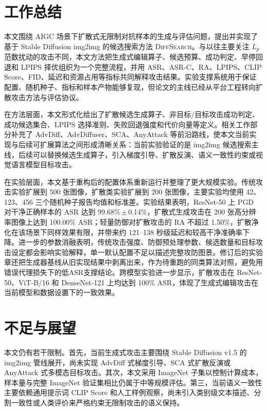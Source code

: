 \documentclass[type=bachelor,oneside]{fduthesis}
\newcommand{\methodname}{\textsc{DiffSearch}}
\begin{document}
\section{工作总结}

本文围绕 AIGC 场景下扩散式无限制对抗样本的生成与评估问题，提出并实现了基于 Stable Diffusion img2img 的候选搜索方法 \methodname。与以往主要关注 $L_p$ 范数扰动的攻击不同，本文方法把生成式编辑算子、候选预算、成功判定、早停回退和 LPIPS 择优组织为一个完整流程，并用 ASR、ASR-C、RA、LPIPS、CLIP Score、FID、延迟和资源占用等指标共同解释攻击结果。实验支撑系统用于保证配置、随机种子、指标和样本产物能够复现，但论文的主线已经从平台工程转向扩散攻击方法与评估协议。

在方法层面，本文形式化给出了扩散候选生成算子、非目标/目标攻击成功判定、成功候选集合、LPIPS 选择准则、失败回退强度和代价向量等定义。相关工作部分补充了 AdvDiff、AdvDiffuser、SCA、AnyAttack 等前沿路线，使本文当前实现与后续可扩展算法之间形成清晰关系：当前实验验证的是 img2img 候选搜索主线，后续可以替换候选生成算子，引入梯度引导、扩散反演、语义一致性约束或视觉语言模型目标攻击。

在实验层面，本文基于重构后的配置体系重新运行并整理了更大规模实验。传统攻击实验扩展到 500 张图像，扩散类实验扩展到 200 张图像，主要实验均使用 42、123、456 三个随机种子报告均值和标准差。实验结果表明，ResNet-50 上 PGD 对干净正确样本的 ASR 达到 99.68\%\,$\pm$\,0.14\%，扩散式生成攻击在 200 张高分辨率图像上达到 100.00\% ASR；轻量防御对扩散攻击的 RA 不超过 1.50\%，扩散净化在该场景下同样效果有限，并带来约 121--138 秒级延迟和较高干净准确率下降。进一步的参数消融表明，传统攻击强度、防御预处理参数、候选数量和目标攻击设定都会影响实验解释，单一默认配置不足以描述完整攻防图景。修订后的实验章还把生成器基线从旧实现结果中剥离出来，作为待重跑的同类算法对照，避免用错误代理损失下的低ASR支撑结论。跨模型实验进一步显示，扩散攻击在 ResNet-50、ViT-B/16 和 DenseNet-121 上均达到 100\% ASR，体现了生成式编辑攻击在当前模型和数据设置下的一致效果。

\section{不足与展望}

本文仍有若干限制。首先，当前生成式攻击主要围绕 Stable Diffusion v1.5 的 img2img 管线展开，尚未实现 AdvDiff 式梯度引导、SCA 式扩散反演或 AnyAttack 式多模态目标攻击。其次，本文采用 ImageNet 子集以控制计算成本，样本量与完整 ImageNet 验证集相比仍属于中等规模评估。第三，当前语义一致性主要依赖通用提示词 CLIP Score 和人工样例观察，尚未引入类别级文本描述、分割一致性或人类评价来严格约束无限制攻击的语义保持。
\end{document}
